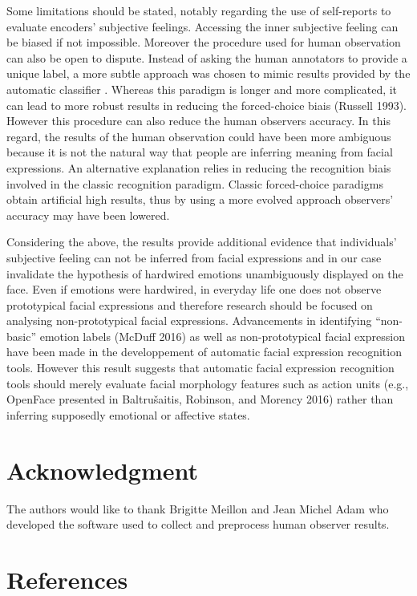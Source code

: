 \documentclass[conference,final,]{IEEEtran}
\begin{document}
Some limitations should be stated, notably regarding the use of
self-reports to evaluate encoders' subjective feelings. Accessing the
inner subjective feeling can be biased if not impossible. Moreover the
procedure used for human observation can also be open to dispute.
Instead of asking the human annotators to provide a unique label, a more
subtle approach was chosen to mimic results provided by the automatic
classifier . Whereas this paradigm is longer and more complicated, it
can lead to more robust results in reducing the forced-choice biais
(Russell 1993). However this procedure can also reduce the human
observers accuracy. In this regard, the results of the human observation
could have been more ambiguous because it is not the natural way that
people are inferring meaning from facial expressions. An alternative
explanation relies in reducing the recognition biais involved in the
classic recognition paradigm. Classic forced-choice paradigms obtain
artificial high results, thus by using a more evolved approach
observers' accuracy may have been lowered.

Considering the above, the results provide additional evidence that
individuals' subjective feeling can not be inferred from facial
expressions and in our case invalidate the hypothesis of hardwired
emotions unambiguously displayed on the face. Even if emotions were
hardwired, in everyday life one does not observe prototypical facial
expressions and therefore research should be focused on analysing
non-prototypical facial expressions. Advancements in identifying
``non-basic'' emotion labels (McDuff 2016) as well as non-prototypical
facial expression have been made in the developpement of automatic
facial expression recognition tools. However this result suggests that
automatic facial expression recognition tools should merely evaluate
facial morphology features such as action units (e.g., OpenFace
presented in Baltrušaitis, Robinson, and Morency 2016) rather than
inferring supposedly emotional or affective states.

\hypertarget{acknowledgment}{%
\section{Acknowledgment}\label{acknowledgment}}

The authors would like to thank Brigitte Meillon and Jean Michel Adam
who developed the software used to collect and preprocess human observer
results.

\hypertarget{references}{%
\section*{References}\label{references}}
\end{document}

